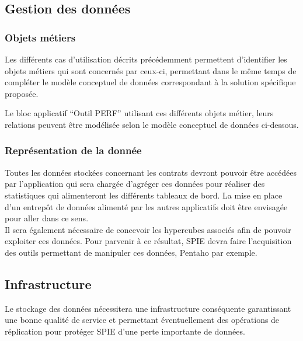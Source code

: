 
\subsection{Gestion des données}

\subsubsection{Objets métiers}

Les différents cas d’utilisation décrits précédemment permettent d’identifier les objets métiers qui sont concernés par ceux-ci, permettant dans le même temps de compléter le modèle conceptuel de données correspondant à la solution spécifique proposée.


Le bloc applicatif “Outil PERF” utilisant ces différents objets métier, leurs relations peuvent être modélisée selon le modèle conceptuel de données ci-dessous.


\subsubsection{Représentation de la donnée}

Toutes les données stockées concernant les contrats devront pouvoir être accédées par l’application qui sera chargée d’agréger ces données pour réaliser des statistiques qui alimenteront les différents tableaux de bord. La mise en place d’un entrepôt de données alimenté par les autres applicatifs doit être envisagée pour aller dans ce sens. \\

Il sera également nécessaire de concevoir les hypercubes associés afin de pouvoir exploiter ces données. Pour parvenir à ce résultat, SPIE devra faire l’acquisition des outils permettant de manipuler ces données, Pentaho par exemple. 

\subsection{Infrastructure}

Le stockage des données nécessitera une infrastructure conséquente garantissant une bonne qualité de service et permettant éventuellement des opérations de réplication pour protéger SPIE d’une perte importante de données. \\

